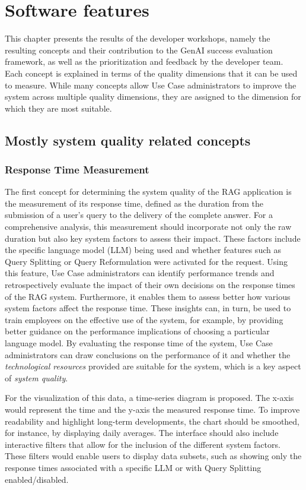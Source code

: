 \documentclass[
	english,
	ruledheaders=section,%
	class=report,%
	thesis={type=bachelor},%
	accentcolor=1b,%
	custommargins=true,%
	marginpar=false,%
	parskip=half-,%
	fontsize=11pt,%
	DIV=14,
]{tudapub}
\begin{document}
\section{Software features}
This chapter presents the results of the developer workshops, namely the resulting concepts and their contribution to the GenAI success evaluation framework, as well as the prioritization and feedback by the developer team. Each concept is explained in terms of the quality dimensions that it can be used to measure. While many concepts allow Use Case administrators to improve the system across multiple quality dimensions, they are assigned to the dimension for which they are most suitable.
\subsection{Mostly system quality related concepts}
\subsubsection{Response Time Measurement}
The first concept for determining the system quality of the RAG application is the measurement of its response time, defined as the duration from the submission of a user's query to the delivery of the complete answer. For a comprehensive analysis, this measurement should incorporate not only the raw duration but also key system factors to assess their impact. These factors include the specific language model (LLM) being used and whether features such as Query Splitting or Query Reformulation were activated for the request. Using this feature, Use Case administrators can identify performance trends and retrospectively evaluate the impact of their own decisions on the response times of the RAG system. Furthermore, it enables them to assess better how various system factors affect the response time. These insights can, in turn, be used to train employees on the effective use of the system, for example, by providing better guidance on the performance implications of choosing a particular language model. By evaluating the response time of the system, Use Case administrators can draw conclusions on the performance of it and whether the \textit{technological resources} provided are suitable for the system, which is a key aspect of \textit{system quality}.

For the visualization of this data, a time-series diagram is proposed. The x-axis would represent the time and the y-axis the measured response time. To improve readability and highlight long-term developments, the chart should be smoothed, for instance, by displaying daily averages. The interface should also include interactive filters that allow for the inclusion of the different system factors. These filters would enable users to display data subsets, such as showing only the response times associated with a specific LLM or with Query Splitting enabled/disabled.
\end{document}
